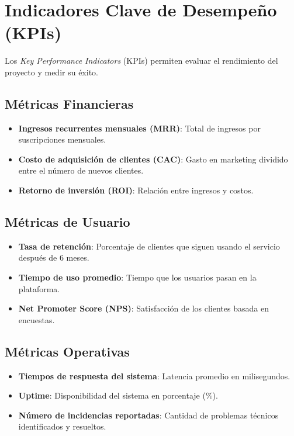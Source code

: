 \section{Indicadores Clave de Desempeño (KPIs)}

Los \textit{Key Performance Indicators} (KPIs) permiten evaluar el rendimiento del proyecto y medir su éxito.

\subsection{Métricas Financieras}
\begin{itemize}
	\item \textbf{Ingresos recurrentes mensuales (MRR)}: Total de ingresos por suscripciones mensuales.
	\item \textbf{Costo de adquisición de clientes (CAC)}: Gasto en marketing dividido entre el número de nuevos clientes.
	\item \textbf{Retorno de inversión (ROI)}: Relación entre ingresos y costos.
\end{itemize}

\subsection{Métricas de Usuario}
\begin{itemize}
	\item \textbf{Tasa de retención}: Porcentaje de clientes que siguen usando el servicio después de 6 meses.
	\item \textbf{Tiempo de uso promedio}: Tiempo que los usuarios pasan en la plataforma.
	\item \textbf{Net Promoter Score (NPS)}: Satisfacción de los clientes basada en encuestas.
\end{itemize}

\subsection{Métricas Operativas}
\begin{itemize}
	\item \textbf{Tiempos de respuesta del sistema}: Latencia promedio en milisegundos.
	\item \textbf{Uptime}: Disponibilidad del sistema en porcentaje (\%).
	\item \textbf{Número de incidencias reportadas}: Cantidad de problemas técnicos identificados y resueltos.
\end{itemize}


